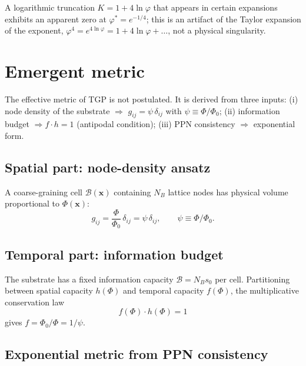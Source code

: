 \documentclass[11pt,a4paper]{article}
\renewcommand{\Phi}{\varPhi}
\newcommand{\PhiZero}{\varPhi_{0}}
\begin{document}
A logarithmic truncation $K=1+4\ln\varphi$ that appears in certain
expansions exhibits an apparent zero at $\varphi^{\ast}=e^{-1/4}$; this
is an artifact of the Taylor expansion of the exponent,
$\varphi^{4}=e^{4\ln\varphi}=1+4\ln\varphi+\dots$, not a physical
singularity.

\section{Emergent metric}\label{sec:metric}

The effective metric of TGP is not postulated. It is derived from three
inputs:
(i) node density of the substrate $\Rightarrow$ $g_{ij}=\psi\,\delta_{ij}$
with $\psi\equiv\Phi/\PhiZero$;
(ii) information budget $\Rightarrow f\cdot h=1$ (antipodal condition);
(iii) PPN consistency $\Rightarrow$ exponential form.

\subsection{Spatial part: node-density ansatz}

A coarse-graining cell $\mathcal{B}(\mathbf{x})$ containing $N_{B}$
lattice nodes has physical volume proportional to $\Phi(\mathbf{x})$:
\begin{equation}\label{eq:g-spatial}
  g_{ij}=\frac{\Phi}{\PhiZero}\,\delta_{ij}=\psi\,\delta_{ij},
  \qquad \psi\equiv\Phi/\PhiZero.
\end{equation}

\subsection{Temporal part: information budget}

The substrate has a fixed information capacity $\mathcal{B}=N_{B}s_{0}$ per
cell. Partitioning between spatial capacity $h(\Phi)$ and temporal
capacity $f(\Phi)$, the multiplicative conservation law
\begin{equation}\label{eq:fh-1}
  f(\Phi)\cdot h(\Phi)=1
\end{equation}
gives $f=\PhiZero/\Phi=1/\psi$.

\subsection{Exponential metric from PPN consistency}
\end{document}
